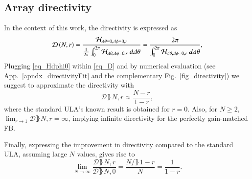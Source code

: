 \subsection{Array directivity}
In the context of this work, the directivity is expressed as
\begin{equation}\label{eq_D}
    \mathcal{D}\rBrace{N,r} = \frac{\Hr_{\Delta\theta=0,\Delta\phi=0,r}}{\frac{1}{2\pi}\int_{0}^{2\pi}\Hr_{\Delta\theta,\Delta\phi=0,r}\ d\Delta\theta} = \frac{2\pi}{\int_{0}^{2\pi}\Hr_{\Delta\theta,\Delta\phi=0,r}\ d\Delta\theta},
\end{equation}
Plugging \eqref{eq_Hdphi0} within \eqref{eq_D} and by numerical evaluation (see App.~\ref{apndx_directivityFit} and the complementary Fig.~\ref{fig_directivity}) we suggest to approximate the directivity with 
\begin{equation}\label{eq_D_result}
    \mathcal{D}\rBrace{N,r} \approx \frac{N-r}{1-r},
\end{equation}
where the standard ULA's known result is obtained for $r=0$.
Also, for $N\geq2$, $\lim_{r\rightarrow 1}\mathcal{D}\rBrace{N,r}=\infty$, implying infinite directivity for the perfectly gain-matched FB. 
\par Finally, expressing the improvement in directivity compared to the standard ULA, assuming large $N$ values, gives rise to
\begin{equation}\label{eq_Dimprovement}
\lim_{N\to\infty}\frac{\mathcal{D}\rBrace{N,r}}{\mathcal{D}\rBrace{N,0}}
=\frac{N/\rBrace{1-r}}{N}=\frac{1}{1-r}.
\end{equation}
